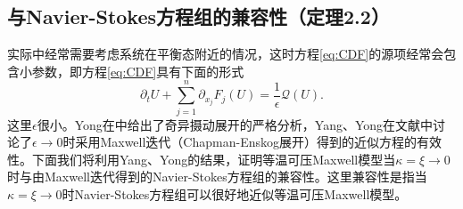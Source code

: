 	\subsection{与Navier-Stokes方程组的兼容性（定理2.2）}%
	实际中经常需要考虑系统在平衡态附近的情况，这时方程\eqref{eq:CDF}的源项经常会包含小参数，即方程\eqref{eq:CDF}具有下面的形式
	\begin{equation}\label{eq:CDFSingular}
		\partial_t U + \sum_{j=1}^n \partial_{x_j} F_j(U) = \frac{1}{\epsilon}\mathcal{Q} (U) .
	\end{equation}
	这里$\epsilon$很小。Yong在\cite{yong1999singular}中给出了奇异摄动展开的严格分析，Yang、Yong在文献\cite{yang2015validity}中讨论了$\epsilon \rightarrow 0$时采用Maxwell迭代（Chapman-Enskog展开）得到的近似方程的有效性。下面我们将利用Yang、Yong的结果\cite{yang2015validity}，证明等温可压Maxwell模型当$\kappa=\xi \rightarrow 0$时与由Maxwell迭代得到的Navier-Stokes方程组的兼容性。这里兼容性是指当$\kappa=\xi \rightarrow 0$时Navier-Stokes方程组可以很好地近似等温可压Maxwell模型。

